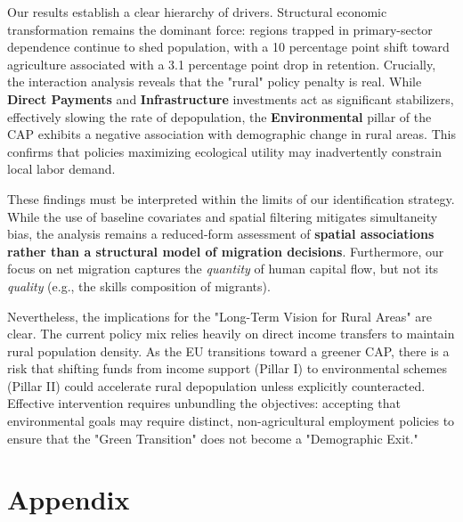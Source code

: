 \documentclass[
	a4paper, %
	10pt, %
]{LTJournalArticle}
\begin{document}
Our results establish a clear hierarchy of drivers. Structural economic transformation remains the dominant force: regions trapped in primary-sector dependence continue to shed population, with a 10 percentage point shift toward agriculture associated with a 3.1 percentage point drop in retention. Crucially, the interaction analysis reveals that the "rural" policy penalty is real. While \textbf{Direct Payments} and \textbf{Infrastructure} investments act as significant stabilizers, effectively slowing the rate of depopulation, the \textbf{Environmental} pillar of the CAP exhibits a negative association with demographic change in rural areas. This confirms that policies maximizing ecological utility may inadvertently constrain local labor demand.

These findings must be interpreted within the limits of our identification strategy. While the use of baseline covariates and spatial filtering mitigates simultaneity bias, the analysis remains a reduced-form assessment of \textbf{spatial associations rather than a structural model of migration decisions}. Furthermore, our focus on net migration captures the \textit{quantity} of human capital flow, but not its \textit{quality} (e.g., the skills composition of migrants).

Nevertheless, the implications for the "Long-Term Vision for Rural Areas" are clear. The current policy mix relies heavily on direct income transfers to maintain rural population density. As the EU transitions toward a greener CAP, there is a risk that shifting funds from income support (Pillar I) to environmental schemes (Pillar II) could accelerate rural depopulation unless explicitly counteracted. Effective intervention requires unbundling the objectives: accepting that environmental goals may require distinct, non-agricultural employment policies to ensure that the "Green Transition" does not become a "Demographic Exit."




\nocite{10.48364/ISIMIP.836809.1}

\clearpage

\section{Appendix}
\end{document}
